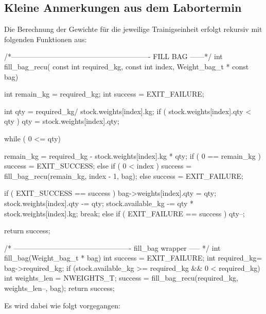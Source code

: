 \documentclass[
   draft=false
  ,paper=a4
  ,twoside=false
  ,fontsize=11pt
  ,headsepline
  ,BCOR10mm
  ,DIV11
  ,parskip=full+
]{scrartcl} %
\begin{document}
\subsection{Kleine Anmerkungen aus dem Labortermin}
  Die Berechnung der Gewichte für die jeweilige Trainigseinheit erfolgt
  rekursiv mit folgenden Funktionen aus:
  \begin{ccode}
/*---------------------------------------------------------- FILL BAG ------*/
int fill_bag_recu( const int required_kg,
                   const int index,
                   Weight_bag_t * const bag){
    int remain_kg = required_kg;
    int success = EXIT_FAILURE;

    int qty = required_kg/ stock.weights[index].kg;
    if ( stock.weights[index].qty < qty ){
        qty = stock.weights[index].qty;
    }

    while ( 0 <= qty){

        remain_kg = required_kg - stock.weights[index].kg * qty;
        if ( 0 == remain_kg ){
            success = EXIT_SUCCESS;
        } else {
            if ( 0 < index ){
                success = fill_bag_recu(remain_kg, index - 1, bag);
            } else {
                success = EXIT_FAILURE;
            }
        }

        if ( EXIT_SUCCESS == success ){
            bag->weights[index].qty = qty;
            stock.weights[index].qty -= qty;
            stock.available_kg -= qty * stock.weights[index].kg;
            break;
        } else if ( EXIT_FAILURE == success ){
            qty--;
        }
    }
    return success;
}
/* ------------------------------------------------- fill_bag wrapper ----- */
int fill_bag(Weight_bag_t * bag){
    int success = EXIT_FAILURE;
    int required_kg= bag->required_kg;
    if (stock.available_kg >= required_kg && 0 < required_kg){
    int weights_len = NWEIGHTS_T;
        success = fill_bag_recu(required_kg, weights_len--, bag);
    }
    return success;
}
  \end{ccode}
Es wird dabei wie folgt vorgegangen:
\end{document}
